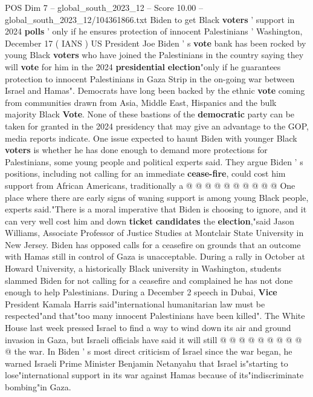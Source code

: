 \begin{textsample}{POS Dim 7 – global\_south\_2023\_12 – Score 10.00 – global\_south\_2023\_12/104361866.txt}  \label{ex:f7_pos_257}
Biden to get Black \textbf{voters} ' support in 2024 \textbf{polls} ' only if he ensures protection of innocent Palestinians ' Washington, December 17 ( IANS ) US President Joe Biden ' s \textbf{vote} bank has been rocked by young Black \textbf{voters} who have joined the Palestinians in the country saying they will \textbf{vote} for him in the 2024 \textbf{presidential} \textbf{election}"only if he guarantees protection to innocent Palestinians in Gaza Strip in the on-going war between Israel and Hamas".
Democrats have long been backed by the ethnic \textbf{vote} coming from communities drawn from Asia, Middle East, Hispanics and the bulk majority Black \textbf{Vote}.
None of these bastions of the \textbf{democratic} party can be taken for granted in the 2024 presidency that may give an advantage to the GOP, media reports indicate.
One issue expected to haunt Biden with younger Black \textbf{voters} is whether he has done enough to demand more protections for Palestinians, some young people and political experts said.
They argue Biden ' s positions, including not calling for an immediate \textbf{cease-fire}, could cost him support from African Americans, traditionally a @ @ @ @ @ @ @ @ @ @ One place where there are early signs of waning support is among young Black people, experts said."There is a moral imperative that Biden is choosing to ignore, and it can very well cost him and down \textbf{ticket} \textbf{candidates} the \textbf{election},"said Jason Williams, Associate Professor of Justice Studies at Montclair State University in New Jersey.
Biden has opposed calls for a ceasefire on grounds that an outcome with Hamas still in control of Gaza is unacceptable.
During a rally in October at Howard University, a historically Black university in Washington, students slammed Biden for not calling for a ceasefire and complained he has not done enough to help Palestinians.
During a December 2 speech in Dubai, \textbf{Vice} President Kamala Harris said"international humanitarian law must be respected"and that"too many innocent Palestinians have been killed".
The White House last week pressed Israel to find a way to wind down its air and ground invasion in Gaza, but Israeli officials have said it will still @ @ @ @ @ @ @ @ @ @ the war.
In Biden ' s most direct criticism of Israel since the war began, he warned Israeli Prime Minister Benjamin Netanyahu that Israel is"starting to lose"international support in its war against Hamas because of its"indiscriminate bombing"in Gaza.

\end{textsample}
